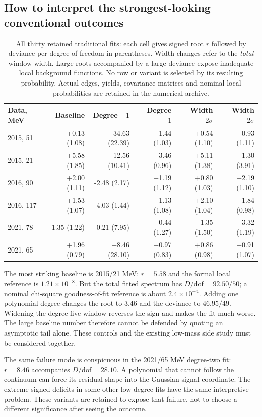 \clearpage
\subsection*{How to interpret the strongest-looking conventional outcomes}
\begin{table}[H]
\centering\small
\begin{tabular}{lrrrrr}
\toprule
Data, MeV & Baseline & Degree $-1$ & Degree $+1$ & Width $-2\sigma$ & Width $+2\sigma$ \\
\midrule
2015, 51 & +0.13 (1.08) & -34.63 (22.39) & +1.44 (1.03) & +0.54 (1.10) & -0.93 (1.11) \\
2015, 21 & +5.58 (1.85) & -12.56 (10.41) & +3.46 (0.96) & +5.11 (1.38) & -1.30 (3.91) \\
2016, 90 & +2.00 (1.11) & -2.48 (2.17) & +1.19 (1.12) & +0.80 (1.03) & +2.19 (1.10) \\
2016, 117 & +1.53 (1.07) & -4.03 (1.44) & +1.13 (1.08) & +2.10 (1.04) & +1.84 (0.98) \\
2021, 78 & -1.35 (1.22) & -0.21 (7.95) & -0.44 (1.27) & -1.35 (1.50) & -3.32 (1.19) \\
2021, 65 & +1.96 (0.79) & +8.46 (28.10) & +0.97 (0.83) & +0.86 (0.98) & +0.91 (1.07) \\
\bottomrule
\end{tabular}
\caption{All thirty retained traditional fits: each cell gives signed root $r$ followed by deviance per degree of freedom in parentheses. Width changes refer to the \emph{total} window width. Large roots accompanied by a large deviance expose inadequate local background functions. No row or variant is selected by its resulting probability. Actual edges, yields, covariance matrices and nominal local probabilities are retained in the numerical archive.}\label{tab:traditional-all}
\end{table}

The most striking baseline is 2015/21 MeV: $r=5.58$ and the formal local reference is $1.21\times10^{-8}$. But the total fitted spectrum has $D/\mathrm{dof}=92.50/50$; a nominal chi-square goodness-of-fit reference is about $2.4\times10^{-4}$. Adding one polynomial degree changes the root to 3.46 and the deviance to $46.95/49$. Widening the degree-five window reverses the sign and makes the fit much worse. The large baseline number therefore cannot be defended by quoting an asymptotic tail alone. These controls and the existing low-mass side study must be considered together.

The same failure mode is conspicuous in the 2021/65 MeV degree-two fit: $r=8.46$ accompanies $D/\mathrm{dof}=28.10$. A polynomial that cannot follow the continuum can force its residual shape into the Gaussian signal coordinate. The extreme signed deficits in some other low-degree fits have the same interpretive problem. These variants are retained to expose that failure, not to choose a different significance after seeing the outcome.

